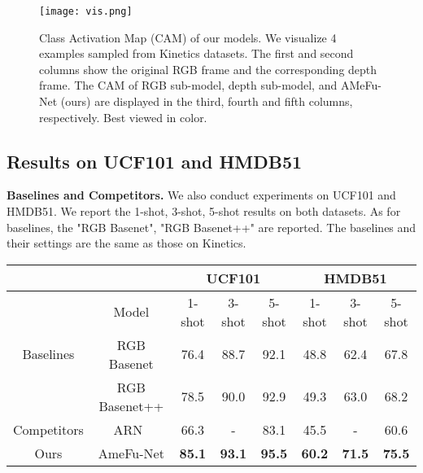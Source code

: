\documentclass[sigconf]{acmart}
\begin{document}
	
	\begin{figure*}[h]\centering
		{\texttt{[image: vis.png]}}
		\vspace{-0.15in}
		\caption{Class Activation Map (CAM) of our models. We visualize 4 examples sampled from Kinetics datasets. The first and second columns show the original RGB frame and the corresponding depth frame. The CAM of RGB sub-model, depth sub-model, and AMeFu-Net (ours) are displayed in the third, fourth and fifth columns, respectively. Best viewed in color. \label{visulization} }
\end{figure*}
	
	
	
	
	
	\subsection{Results on UCF101 and HMDB51}
	
	\noindent \textbf{Baselines and Competitors.} 
	We also conduct experiments on UCF101 and HMDB51.
	We report the 1-shot, 3-shot, 5-shot results on both datasets.
	As for baselines, the "RGB Basenet", "RGB Basenet++" are reported.  
	The baselines and their settings are the same as those on Kinetics.
	
	
	
	\begin{table*} 
		\begin{tabular}{c|c|c|c|c|c|c|c}
			\hline 
			& \multicolumn{1}{c|}{} & \multicolumn{3}{c|}{UCF101} & \multicolumn{3}{c}{HMDB51}\tabularnewline
			\hline 
			& Model & 1-shot & 3-shot & 5-shot & 1-shot & 3-shot & 5-shot\tabularnewline
			\hline 
			{Baselines} & RGB Basenet & 76.4 & 88.7 & 92.1 & 48.8 & 62.4 & 67.8\tabularnewline
			\cline{2-8} \cline{3-8} \cline{4-8} \cline{5-8} \cline{6-8} \cline{7-8} \cline{8-8} 
			& RGB Basenet++ & 78.5 & 90.0 & 92.9 & 49.3 & 63.0 & 68.2 \tabularnewline
			\cline{2-8} \cline{3-8} \cline{4-8} \cline{5-8} \cline{6-8} \cline{7-8} \cline{8-8} 
			
			\hline 
			{Competitors} & ARN~\cite{zhang2020few} & 66.3 & - & 83.1 & 45.5 & - & 60.6\tabularnewline
			\hline 
			\hline 
			Ours & AmeFu-Net & \textbf{85.1} & \textbf{93.1} & \textbf{95.5} & \textbf{60.2} & \textbf{71.5} & \textbf{75.5}\tabularnewline
			\hline 
		\end{tabular}
	\end{table*}
	
\end{document}
